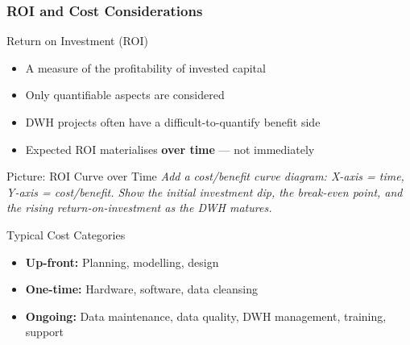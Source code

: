 \begin{frame}
  \frametitle{ROI and Cost Considerations}

  \begin{block}{Return on Investment (ROI)}
    \begin{itemize}
      \item A measure of the profitability of invested capital
      \item Only quantifiable aspects are considered
      \item DWH projects often have a difficult-to-quantify benefit side
      \item Expected ROI materialises \textbf{over time} --- not immediately
    \end{itemize}
  \end{block}

  \begin{alertblock}{Picture: ROI Curve over Time}
    \textit{Add a cost/benefit curve diagram: X-axis = time, Y-axis = cost/benefit.
    Show the initial investment dip, the break-even point, and the rising
    return-on-investment as the DWH matures.}
  \end{alertblock}

  \begin{block}{Typical Cost Categories}
    \begin{itemize}
      \item \textbf{Up-front:} Planning, modelling, design
      \item \textbf{One-time:} Hardware, software, data cleansing
      \item \textbf{Ongoing:} Data maintenance, data quality, DWH management,
        training, support
    \end{itemize}
  \end{block}
\end{frame}
